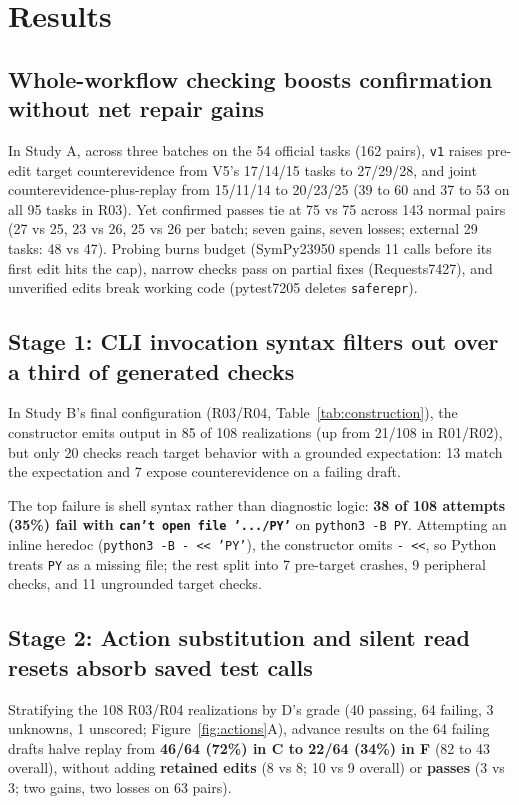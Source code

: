 \section{Results}
\subsection{Whole-workflow checking boosts confirmation without net repair gains}
In Study A, across three batches on the 54 official tasks (162 pairs), \texttt{v1} raises pre-edit target counterevidence from V5's 17/14/15 tasks to 27/29/28, and joint counterevidence-plus-replay from 15/11/14 to 20/23/25 (39 to 60 and 37 to 53 on all 95 tasks in R03). Yet confirmed passes tie at 75 vs 75 across 143 normal pairs (27 vs 25, 23 vs 26, 25 vs 26 per batch; seven gains, seven losses; external 29 tasks: 48 vs 47). Probing burns budget (SymPy23950 spends 11 calls before its first edit hits the cap), narrow checks pass on partial fixes (Requests7427), and unverified edits break working code (pytest7205 deletes \texttt{saferepr}).

\subsection{Stage 1: CLI invocation syntax filters out over a third of generated checks}
In Study B's final configuration (R03/R04, Table~\ref{tab:construction}), the constructor emits output in 85 of 108 realizations (up from 21/108 in R01/R02), but only 20 checks reach target behavior with a grounded expectation: 13 match the expectation and 7 expose counterevidence on a failing draft.

\begin{table}[htbp]
\centering\small

\caption{Check-construction outcomes across 108 R03/R04 realizations (54 tasks, two seeds).}
\label{tab:construction}
\end{table}

The top failure is shell syntax rather than diagnostic logic: \textbf{38 of 108 attempts (35\%) fail with \texttt{can't open file '.../PY'}} on \texttt{python3 -B PY}. Attempting an inline heredoc (\texttt{python3 -B - << 'PY'}), the constructor omits \texttt{- <<}, so Python treats \texttt{PY} as a missing file; the rest split into 7 pre-target crashes, 9 peripheral checks, and 11 ungrounded target checks.

\subsection{Stage 2: Action substitution and silent read resets absorb saved test calls}
Stratifying the 108 R03/R04 realizations by D's grade (40 passing, 64 failing, 3 unknowns, 1 unscored; Figure~\ref{fig:actions}A), advance results on the 64 failing drafts halve replay from \textbf{46/64 (72\%) in C to 22/64 (34\%) in F} (82 to 43 overall), without adding \textbf{retained edits} (8 vs 8; 10 vs 9 overall) or \textbf{passes} (3 vs 3; two gains, two losses on 63 pairs).

